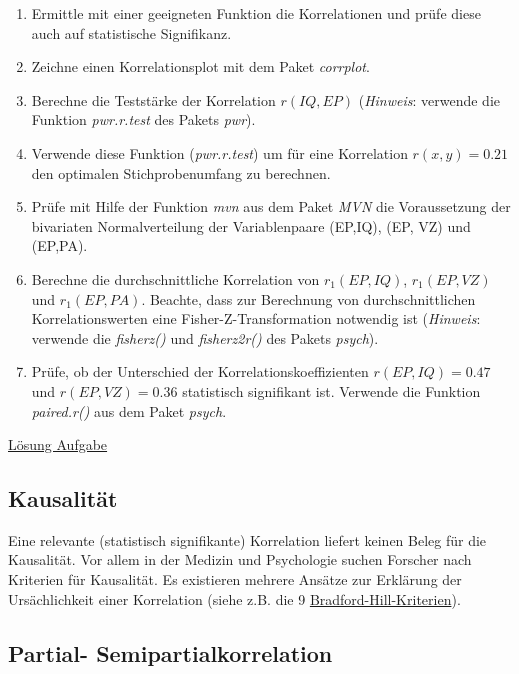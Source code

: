 \documentclass[
]{article}
\providecommand{\tightlist}{%
  \setlength{\itemsep}{0pt}\setlength{\parskip}{0pt}}
\begin{document}
\begin{enumerate}
\def\labelenumi{\arabic{enumi}.}
\tightlist
\item
  Ermittle mit einer geeigneten Funktion die Korrelationen und prüfe diese auch auf statistische Signifikanz.
\item
  Zeichne einen Korrelationsplot mit dem Paket \emph{corrplot}.
\item
  Berechne die Teststärke der Korrelation \(r(IQ, EP)\) (\emph{Hinweis}: verwende die Funktion \emph{pwr.r.test} des Pakets \emph{pwr}).
\item
  Verwende diese Funktion (\emph{pwr.r.test}) um für eine Korrelation \(r(x,y) = 0.21\) den optimalen Stichprobenumfang zu berechnen.
\item
  Prüfe mit Hilfe der Funktion \emph{mvn} aus dem Paket \emph{MVN} die Voraussetzung der bivariaten Normalverteilung der Variablenpaare (EP,IQ), (EP, VZ) und (EP,PA).
\item
  Berechne die durchschnittliche Korrelation von \(r_1(EP,IQ)\), \(r_1(EP,VZ)\) und \(r_1(EP,PA)\). Beachte, dass zur Berechnung von durchschnittlichen Korrelationswerten eine Fisher-Z-Transformation notwendig ist (\emph{Hinweis}: verwende die \emph{fisherz()} und \emph{fisherz2r()} des Pakets \emph{psych}).
\item
  Prüfe, ob der Unterschied der Korrelationskoeffizienten \(r(EP,IQ) = 0.47\) und \(r(EP,VZ) = 0.36\)
  statistisch signifikant ist. Verwende die Funktion \emph{paired.r()} aus dem Paket \emph{psych}.
\end{enumerate}

\hyperref[aufgabe-korrelation-lsg]{Lösung Aufgabe}

\subsection*{Kausalität}\label{kausalituxe4t}

Eine relevante (statistisch signifikante) Korrelation liefert keinen Beleg für die Kausalität. Vor allem in der Medizin und Psychologie suchen Forscher nach Kriterien für Kausalität. Es existieren mehrere Ansätze zur Erklärung der Ursächlichkeit einer Korrelation (siehe z.B. die 9 \href{https://de.wikipedia.org/wiki/\%C3\%84tiologie_(Medizin)}{Bradford-Hill-Kriterien}).

\subsection*{Partial- Semipartialkorrelation}\label{partial--semipartialkorrelation}
\end{document}
